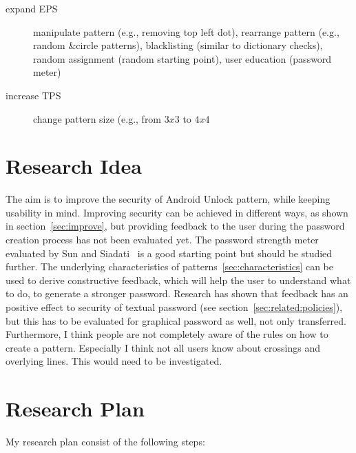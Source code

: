 \documentclass[twocolumn, a4paper, 10pt]{article}
\begin{document}
\begin{description}
	\item[expand EPS] manipulate pattern (e.g., removing top left dot), rearrange pattern (e.g., random \&circle patterns), blacklisting (similar to dictionary checks), random assignment (random starting point), user education (password meter)
	\item[increase TPS] change pattern size (e.g., from $3x3$ to $4x4$
\end{description}

\section{Research Idea}
\label{sec:idea}
The aim is to improve the security of Android Unlock pattern, while keeping usability in mind. Improving security can be achieved in different ways, as shown in section~\ref{sec:improve}, but providing feedback to the user during the password creation process has not been evaluated yet. The password strength meter evaluated by Sun\cite{Sun2014308} and Siadati~\cite{siadati2015fortifying} is a good starting point but should be studied further. The underlying characteristics of patterns~\ref{sec:characteristics} can be used to derive constructive feedback, which will help the user to understand what to do, to generate a stronger password. Research has shown that feedback has an positive effect to security of textual password (see section~\ref{sec:related:policies}), but this has to be evaluated for graphical password as well, not only transferred.\\

Furthermore, I think people are not completely aware of the rules on how to create a pattern. Especially I think not all users know about crossings and overlying lines. This would need to be investigated.\\

\section{Research Plan}
\label{sec:plan}

My research plan consist of the following steps:\\
\end{document}
